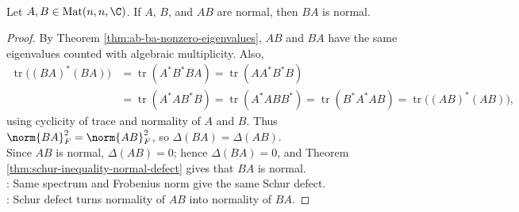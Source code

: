 \begin{theorem} \label{thm:normality-transfer-ab-ba} \\
Let $A,B\in\operatorname{Mat}(n,n,\C)$. If $A$, $B$, and $AB$ are normal, then $BA$ is normal.
\begin{proof}
By Theorem \ref{thm:ab-ba-nonzero-eigenvalues}, $AB$ and $BA$ have the same eigenvalues counted with algebraic multiplicity. Also,
\begin{align}
\operatorname{tr}\bigl((BA)^*(BA)\bigr) &=\operatorname{tr}(A^*B^*BA) =\operatorname{tr}(AA^*B^*B) \nonumber\\
&=\operatorname{tr}(A^*AB^*B) =\operatorname{tr}(A^*A BB^*) =\operatorname{tr}(B^*A^*AB) =\operatorname{tr}\bigl((AB)^*(AB)\bigr),
\nonumber
\end{align}
using cyclicity of trace and normality of $A$ and $B$. Thus $\norm{BA}_F^2=\norm{AB}_F^2$, so $\Delta(BA)=\Delta(AB)$.\\
Since $AB$ is normal, $\Delta(AB)=0$; hence $\Delta(BA)=0$, and Theorem \ref{thm:schur-inequality-normal-defect} gives that $BA$ is normal.\\
: Same spectrum and Frobenius norm give the same Schur defect.\\
: Schur defect turns normality of $AB$ into normality of $BA$.
\end{proof}
\end{theorem}

